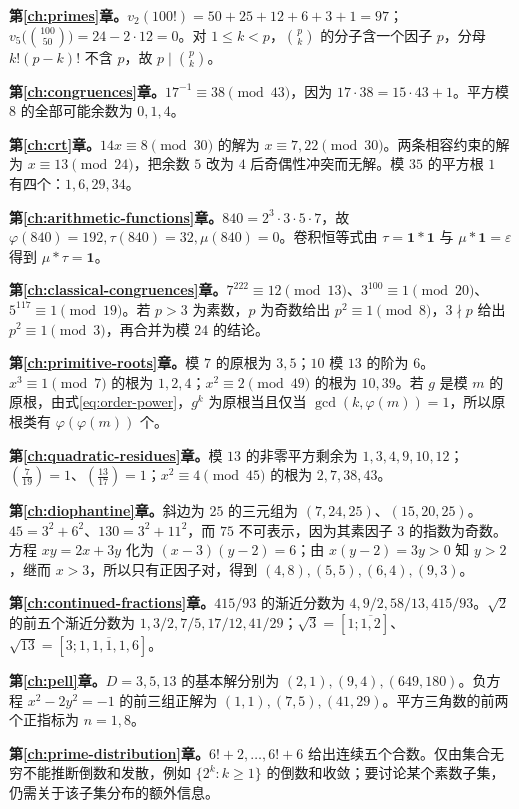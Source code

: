 \documentclass[UTF8,12pt,a4paper,fontset=fandol]{ctexbook}
\begin{document}
\textbf{第\ref{ch:primes}章。}$v_2(100!)=50+25+12+6+3+1=97$；$v_5\bigl(\binom{100}{50}\bigr)=24-2\cdot12=0$。对 $1\le k<p$，$\binom pk$ 的分子含一个因子 $p$，分母 $k!(p-k)!$ 不含 $p$，故 $p\mid\binom pk$。

\textbf{第\ref{ch:congruences}章。}$17^{-1}\equiv38\pmod{43}$，因为 $17\cdot38=15\cdot43+1$。平方模 $8$ 的全部可能余数为 $0,1,4$。

\textbf{第\ref{ch:crt}章。}$14x\equiv8\pmod{30}$ 的解为 $x\equiv7,22\pmod{30}$。两条相容约束的解为 $x\equiv13\pmod{24}$，把余数 $5$ 改为 $4$ 后奇偶性冲突而无解。模 $35$ 的平方根 $1$ 有四个：$1,6,29,34$。

\textbf{第\ref{ch:arithmetic-functions}章。}$840=2^3\cdot3\cdot5\cdot7$，故 $\varphi(840)=192,\tau(840)=32,\mu(840)=0$。卷积恒等式由 $\tau=\mathbf1*\mathbf1$ 与 $\mu*\mathbf1=\varepsilon$ 得到 $\mu*\tau=\mathbf1$。

\textbf{第\ref{ch:classical-congruences}章。}$7^{222}\equiv12\pmod{13}$、$3^{100}\equiv1\pmod{20}$、$5^{117}\equiv1\pmod{19}$。若 $p>3$ 为素数，$p$ 为奇数给出 $p^2\equiv1\pmod8$，$3\nmid p$ 给出 $p^2\equiv1\pmod3$，再合并为模 $24$ 的结论。

\textbf{第\ref{ch:primitive-roots}章。}模 $7$ 的原根为 $3,5$；$10$ 模 $13$ 的阶为 $6$。$x^3\equiv1\pmod7$ 的根为 $1,2,4$；$x^2\equiv2\pmod{49}$ 的根为 $10,39$。若 $g$ 是模 $m$ 的原根，由式\eqref{eq:order-power}，$g^k$ 为原根当且仅当 $\gcd(k,\varphi(m))=1$，所以原根类有 $\varphi(\varphi(m))$ 个。

\textbf{第\ref{ch:quadratic-residues}章。}模 $13$ 的非零平方剩余为 $1,3,4,9,10,12$；$\left(\frac7{19}\right)=1$、$\left(\frac{13}{17}\right)=1$；$x^2\equiv4\pmod{45}$ 的根为 $2,7,38,43$。

\textbf{第\ref{ch:diophantine}章。}斜边为 $25$ 的三元组为 $(7,24,25)$、$(15,20,25)$。$45=3^2+6^2$、$130=3^2+11^2$，而 $75$ 不可表示，因为其素因子 $3$ 的指数为奇数。方程 $xy=2x+3y$ 化为 $(x-3)(y-2)=6$；由 $x(y-2)=3y>0$ 知 $y>2$，继而 $x>3$，所以只有正因子对，得到 $(4,8),(5,5),(6,4),(9,3)$。

\textbf{第\ref{ch:continued-fractions}章。}$415/93$ 的渐近分数为 $4,9/2,58/13,415/93$。$\sqrt2$ 的前五个渐近分数为 $1,3/2,7/5,17/12,41/29$；$\sqrt3=[1;\overline{1,2}]$、$\sqrt{13}=[3;\overline{1,1,1,1,6}]$。

\textbf{第\ref{ch:pell}章。}$D=3,5,13$ 的基本解分别为 $(2,1),(9,4),(649,180)$。负方程 $x^2-2y^2=-1$ 的前三组正解为 $(1,1),(7,5),(41,29)$。平方三角数的前两个正指标为 $n=1,8$。

\textbf{第\ref{ch:prime-distribution}章。}$6!+2,\ldots,6!+6$ 给出连续五个合数。仅由集合无穷不能推断倒数和发散，例如 $\{2^k:k\ge1\}$ 的倒数和收敛；要讨论某个素数子集，仍需关于该子集分布的额外信息。
\end{document}
